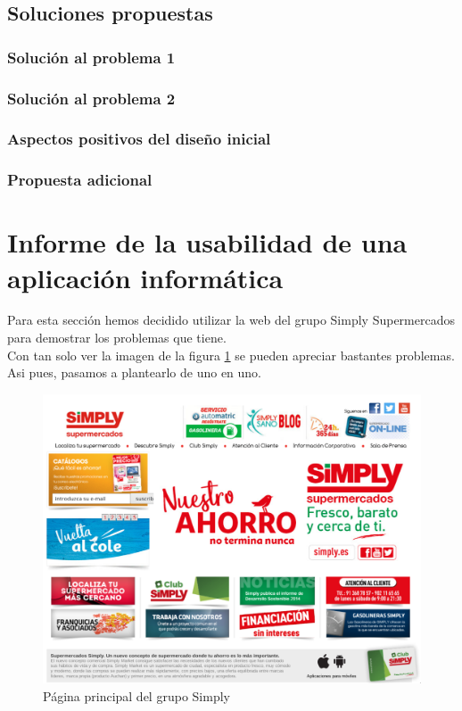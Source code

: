 \documentclass[a4paper,11pt]{article}
\begin{document}
\subsection{Soluciones propuestas}
\subsubsection{Solución al problema 1}
\subsubsection{Solución al problema 2}
\subsubsection{Aspectos positivos del diseño inicial}
\subsubsection{Propuesta adicional}




\section{Informe de la usabilidad de una aplicación informática}
Para esta sección hemos decidido utilizar la web del grupo Simply Supermercados \cite{webSimply} para demostrar los problemas que tiene.\\
Con tan solo ver la imagen de la figura \ref{fig:pagprin} se pueden apreciar bastantes problemas. Asi pues, pasamos a plantearlo de uno en uno.

\begin{figure}[h!]
 \centering
 \includegraphics[scale=0.5]{webPrincipal.png}
 \caption{Página principal del grupo Simply}
 \label{fig:pagprin}
\end{figure}
\end{document}
